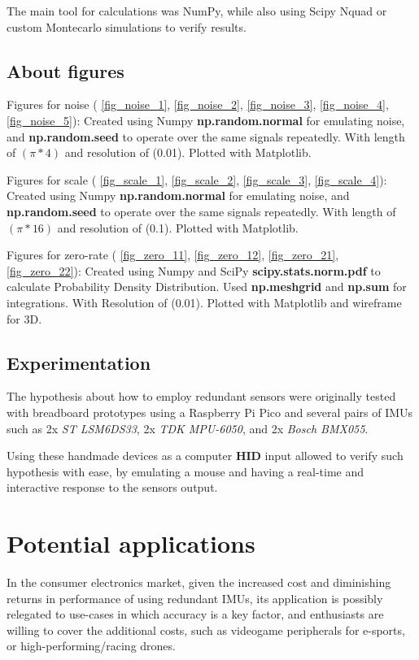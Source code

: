 \documentclass[10pt, twocolumn, a4paper]{article}
\begin{document}
    The main tool for calculations was NumPy, while also using Scipy Nquad or custom Montecarlo simulations to verify results.

    \subsection{About figures}
        Figures for noise (
            \ref{fig_noise_1},
            \ref{fig_noise_2},
            \ref{fig_noise_3},
            \ref{fig_noise_4},
            \ref{fig_noise_5}):
            Created using Numpy \textbf{np.random.normal} for emulating noise, and \textbf{np.random.seed} to operate over the same signals repeatedly. With length of $(\pi * 4)$ and resolution of (0.01). Plotted with Matplotlib.

        Figures for scale (
            \ref{fig_scale_1},
            \ref{fig_scale_2},
            \ref{fig_scale_3},
            \ref{fig_scale_4}):
            Created using Numpy \textbf{np.random.normal} for emulating noise, and \textbf{np.random.seed} to operate over the same signals repeatedly. With length of $(\pi * 16)$ and resolution of (0.1). Plotted with Matplotlib.

        Figures for zero-rate (
            \ref{fig_zero_11},
            \ref{fig_zero_12},
            \ref{fig_zero_21},
            \ref{fig_zero_22}):
            Created using Numpy and SciPy \textbf{scipy.stats.norm.pdf} to calculate Probability Density Distribution. Used \textbf{np.meshgrid} and \textbf{np.sum} for integrations. With Resolution of (0.01). Plotted with Matplotlib and wireframe for 3D.

    \subsection{Experimentation}
    The hypothesis about how to employ redundant sensors were originally tested with breadboard prototypes using a Raspberry Pi Pico and several pairs of IMUs such as 2x \emph{ST LSM6DS33}, 2x \emph{TDK MPU-6050}, and 2x \emph{Bosch BMX055}.

    Using these handmade devices as a computer \textbf{HID} input allowed to verify such hypothesis with ease, by emulating a mouse and having a real-time and interactive response to the sensors output.


\section{Potential applications}
    In the consumer electronics market, given the increased cost and diminishing returns in performance of using redundant IMUs, its application is possibly relegated to use-cases in which accuracy is a key factor, and enthusiasts are willing to cover the additional costs, such as videogame peripherals for e-sports, or high-performing/racing drones.
\end{document}
